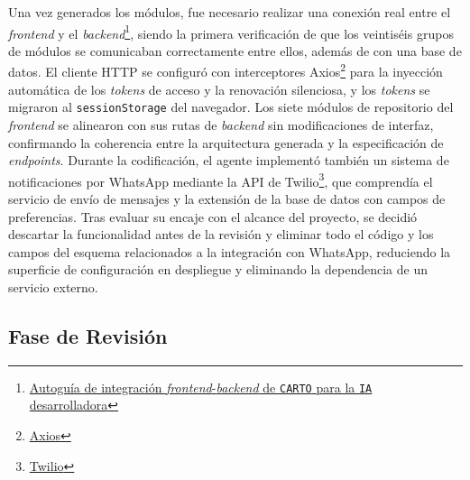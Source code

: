 Una vez generados los módulos, fue necesario realizar una conexión real entre el \textit{frontend} y el \textit{backend}\footnote{\href{https://github.com/alu0101549491/TFG-Fabian-Gonzalez-Lence/blob/main/projects/4-CartographicProjectManager/docs/development/INTEGRATION.md}{Autoguía de integración \textit{frontend}-\textit{backend} de \texttt{CARTO} para la \texttt{IA} desarrolladora}}, siendo la primera verificación de que los veintiséis grupos de módulos se comunicaban correctamente entre ellos, además de con una base de datos. El cliente HTTP se configuró con interceptores Axios\footnote{\href{https://axios.rest/}{Axios}} para la inyección automática de los \textit{tokens} de acceso y la renovación silenciosa, y los \textit{tokens} se migraron al \texttt{sessionStorage} del navegador. Los siete módulos de repositorio del \textit{frontend} se alinearon con sus rutas de \textit{backend} sin modificaciones de interfaz, confirmando la coherencia entre la arquitectura generada y la especificación de \textit{endpoints}. Durante la codificación, el agente implementó también un sistema de notificaciones por WhatsApp mediante la \ac{API} de Twilio\footnote{\href{https://www.twilio.com/en-us/messaging/channels/whatsapp?cq_plac=&cq_net=g&cq_pos=&cq_med=&cq_plt=gp&gad_campaignid=23476018559}{Twilio}}, que comprendía el servicio de envío de mensajes y la extensión de la base de datos con campos de preferencias. Tras evaluar su encaje con el alcance del proyecto, se decidió descartar la funcionalidad antes de la revisión y eliminar todo el código y los campos del esquema relacionados a la integración con WhatsApp, reduciendo la superficie de configuración en despliegue y eliminando la dependencia de un servicio externo.

\subsection{Fase de Revisión}

